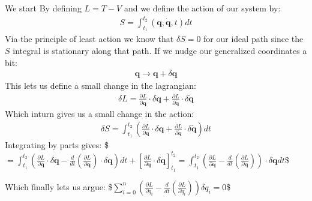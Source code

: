 \documentclass[letterpaper,10pt,english]{jupyterBook}
\begin{document}
\sphinxAtStartPar
We start By defining \(L = T-V\) and we define the action of our system by:
\begin{equation*}
\begin{split}
S = \int_{t_1}^{t_2}(\mathbf{q},\dot{\mathbf{q}},t) dt
\end{split}
\end{equation*}
\sphinxAtStartPar
Via the principle of least action we know that \(\delta S = 0\) for our ideal path since the \(S\) integral is stationary along that path. If we nudge our generalized coordinates a bit:
\begin{equation*}
\begin{split}
\mathbf{q} \rightarrow \mathbf{q} + \delta \mathbf{q} 
\end{split}
\end{equation*}
\sphinxAtStartPar
This lets us define a small change in the lagrangian:
\begin{equation*}
\begin{split}
\delta L = \frac{\partial L}{\partial \mathbf{q}} \cdot \delta \mathbf{q} + \frac{\partial L}{\partial \dot{\mathbf{q}}}\cdot \delta \dot{\mathbf{q}}
\end{split}
\end{equation*}
\sphinxAtStartPar
Which in\sphinxhyphen{}turn gives us a small change in the action:
\begin{equation*}
\begin{split}
\delta S = \int_{t_1}^{t_2} \left(  \frac{\partial L}{\partial \mathbf{q}} \cdot \delta \mathbf{q} + \frac{\partial L}{\partial \dot{\mathbf{q}}}\cdot \delta \dot{\mathbf{q}} \right) dt 
\end{split}
\end{equation*}
\sphinxAtStartPar
Integrating by parts gives:
\$\(
= \int_{t_1}^{t_2} \left(\frac{\partial L}{\partial \mathbf{q}}\cdot  \delta \mathbf{q} - \frac{d}{dt}\left(\frac{\partial L}{\partial \dot{\mathbf{q}}} \right)\cdot\delta\mathbf{q}  \right)dt + \left[\frac{\partial L}{\partial \dot{\mathbf{q}}}\cdot \delta \mathbf{q}\right]_{t_1}^{t_2}
= \int_{t_1}^{t_2} \left(\frac{\partial L}{\partial \mathbf{q}} - \frac{d}{dt}\left(\frac{\partial L}{\partial \mathbf{q}}\right) \right)\cdot \delta\mathbf{q} dt
\)\$

\sphinxAtStartPar
Which finally lets us argue:
\$\(
\sum_{i=0}^n \left(\frac{\partial L}{\partial q_i} - \frac{d}{dt}\left(\frac{\partial L}{\partial \dot{q}_i}\right)  \right) \delta q_i = 0
\)\$
\end{document}
